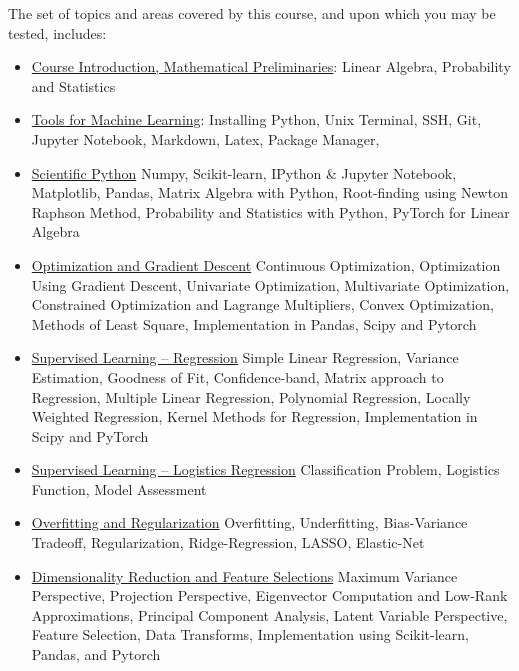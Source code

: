 \documentclass[12pt,nohyper,nobib,xcolor=dvipsnames,svgnames,x11names]{tufte-book}
\begin{document}
The set of topics and areas covered by this course, and upon which you may be tested, includes:

{
\begin{itemize}
	\item \color{OrchardRed} \underline{Course Introduction, Mathematical Preliminaries}: Linear Algebra, Probability and Statistics
	

		\item \color{OrchardRed} \underline{Tools for Machine Learning}: Installing Python, Unix Terminal, SSH, Git, Jupyter Notebook, Markdown, Latex, Package Manager, 
	
	
 
    \item \color{OrchardRed} \underline{Scientific Python} Numpy, Scikit-learn, IPython \& Jupyter Notebook, Matplotlib, Pandas, Matrix Algebra with Python,  Root-finding using Newton Raphson Method, Probability and Statistics with Python, PyTorch for Linear Algebra

    \item  \color{OrchardRed} \underline{Optimization and Gradient Descent} Continuous Optimization, Optimization Using Gradient Descent,  Univariate Optimization, Multivariate Optimization, Constrained Optimization and Lagrange Multipliers, Convex Optimization, Methods of Least Square, Implementation in Pandas, Scipy and Pytorch
    
    \item   \color{OrchardRed} \underline{Supervised Learning -- Regression}  Simple Linear Regression, Variance Estimation, Goodness of Fit, Confidence-band, Matrix approach to Regression, Multiple Linear Regression, Polynomial Regression, Locally Weighted Regression, Kernel Methods for Regression, Implementation in Scipy and PyTorch
    
    \item  \color{OrchardRed} \underline{Supervised Learning -- Logistics Regression} Classification Problem, Logistics Function, Model Assessment

    \item  \color{OrchardRed} \underline{Overfitting and Regularization} Overfitting, Underfitting, Bias-Variance Tradeoff, Regularization, Ridge-Regression, LASSO, Elastic-Net
    
    \item \color{OrchardRed} \underline{Dimensionality Reduction and Feature Selections}  Maximum Variance Perspective, Projection Perspective, Eigenvector Computation and Low-Rank Approximations, Principal Component Analysis, Latent Variable Perspective,  Feature Selection, Data Transforms, Implementation using Scikit-learn, Pandas, and Pytorch
    

\end{itemize}}
\end{document}
